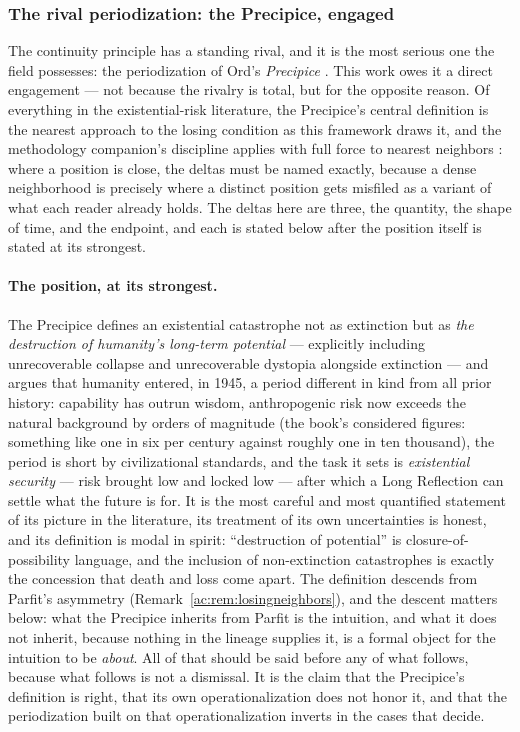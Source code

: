 \documentclass[11pt]{article}
\numberwithin{equation}{section}
\theoremstyle{plain}
\theoremstyle{definition}
\theoremstyle{remark}
\begin{document}
\subsubsection{The rival periodization: the Precipice, engaged}
\label{gc:subsub:precipice}

The continuity principle has a standing rival, and it is the most
serious one the field possesses: the periodization of Ord's
\emph{Precipice} \cite{Ord20}. This work owes it a direct engagement
--- not because the rivalry is total, but for the opposite reason. Of
everything in the existential-risk literature, the Precipice's central
definition is the nearest approach to the losing condition as this
framework draws it, and the methodology companion's discipline applies
with full force to nearest neighbors \cite{Ben26Method}: where a
position is close, the deltas must be named exactly, because a dense
neighborhood is precisely where a distinct position gets misfiled as a
variant of what each reader already holds. The deltas here are three, the quantity, the shape of time, and the endpoint, and each is
stated below after the position itself is stated at its strongest.

\paragraph{The position, at its strongest.} The Precipice defines an
existential catastrophe not as extinction but as \emph{the destruction
of humanity's long-term potential} --- explicitly including
unrecoverable collapse and unrecoverable dystopia alongside extinction
--- and argues that humanity entered, in 1945, a period different in
kind from all prior history: capability has outrun wisdom, anthropogenic
risk now exceeds the natural background by orders of magnitude (the
book's considered figures: something like one in six per century
against roughly one in ten thousand), the period is short by
civilizational standards, and the task it sets is \emph{existential
security} --- risk brought low and locked low --- after which a Long
Reflection can settle what the future is for. It is the most careful
and most quantified statement of its picture in the literature, its
treatment of its own uncertainties is honest, and its definition is
modal in spirit: ``destruction of potential'' is closure-of-possibility
language, and the inclusion of non-extinction catastrophes is exactly
the concession that death and loss come apart. The definition
descends from Parfit's asymmetry \cite{Parfit84}
(Remark~\ref{ac:rem:losingneighbors}), and the descent matters below:
what the Precipice inherits from Parfit is the intuition, and what it
does not inherit, because nothing in the lineage supplies it, is
a formal object for the intuition to be \emph{about}. All of that should be
said before any of what follows, because what follows is not a
dismissal. It is the claim that the Precipice's definition is right,
that its own operationalization does not honor it, and that the
periodization built on that operationalization inverts in the cases
that decide.
\end{document}
